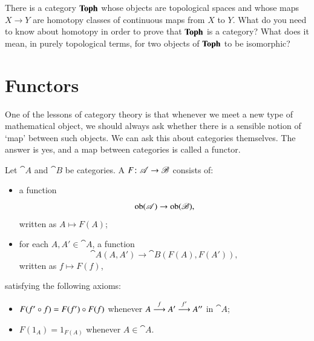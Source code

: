 \begin{question}
There is a category $\mathbf{Toph}$%
%
%
whose objects are topological spaces and whose
maps $X \to Y$ are homotopy%
%
%
classes of continuous maps from $X$ to $Y$.  What do you need to know about
homotopy in order to prove that $\mathbf{Toph}$ is a category?  What does it mean,
in purely topological terms, for two objects of $\mathbf{Toph}$ to be isomorphic?
\end{question}



\section{Functors}
\label{sec:ftrs}


One of the lessons of category theory is that whenever we meet a new type
of mathematical object, we should always ask whether there is a sensible
notion of `map' between such objects.  We can ask this about categories
themselves.  The answer is yes, and a map between categories is called a
functor.

\begin{defn}
Let $\cat{A}$ and $\cat{B}$ be categories.  A %
%
%
$F\from \cat{A} \to \cat{B}$ consists of:
%
\begin{itemize}
\item
a function
\[
\operatorname{ob}(\mathscr{A}) \to \operatorname{ob}(\mathscr{B}),
\]
written as $A \mapsto F(A)$;

\item
for each $A, A' \in \cat{A}$, a function
\[
\cat{A}(A, A') \to \cat{B}(F(A), F(A')),
\]
written as $f \mapsto F(f)$,
\end{itemize}
%
satisfying the following axioms:
%
\begin{itemize}
\item
$F(f' \mathbin{\circ} f) = F(f') \mathbin{\circ} F(f)$ whenever $A \stackrel{f}{\longrightarrow} A' \stackrel{f'}{\longrightarrow} A''$ in
$\cat{A}$;

\item
$F(1_A) = 1_{F(A)}$ whenever $A \in \cat{A}$.
\end{itemize}
\end{defn}

